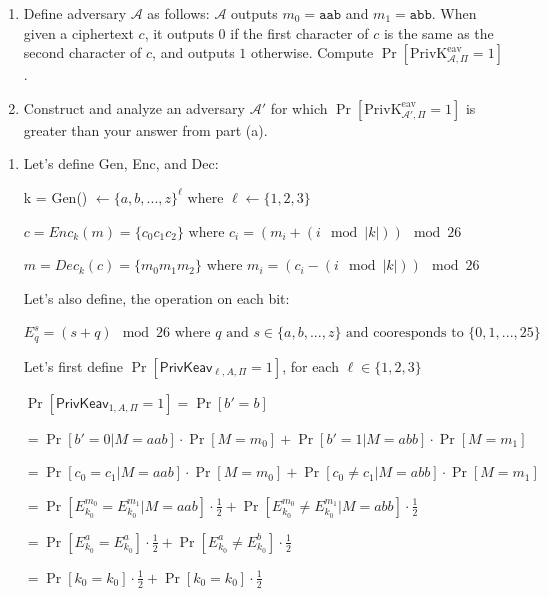 \begin{enumerate}
	\item[(a)] Define adversary $\mathcal{A}$ as follows:  
	$\mathcal{A}$ outputs $m_0=\texttt{aab}$ and $m_1=\texttt{abb}$.  
	When given a ciphertext $c$, it outputs $0$ if the first character of $c$
	is the same as the second character of $c$, and outputs $1$ otherwise.  
	Compute $\Pr[\mathrm{PrivK}^{\mathrm{eav}}_{\mathcal{A},\Pi}=1]$.
	
	\item[(b)] Construct and analyze an adversary $\mathcal{A}'$ for which
	$\Pr[\mathrm{PrivK}^{\mathrm{eav}}_{\mathcal{A}',\Pi}=1]$ is greater than
	your answer from part (a).
\end{enumerate}


\begin{enumerate}
	\item[(a)] Let's define Gen, Enc, and Dec:
	
	k = Gen() $\leftarrow \{a, b, ... , z\}^\ell \text{ where } \ell \leftarrow \{1, 2, 3\}$
	
	$c = Enc_k(m) = \{c_0c_1c_2\} \text{ where } c_i = (m_i + (i \mod |k|))\mod 26$

    $m = Dec_k(c) = \{m_0m_1m_2\} \text{ where } m_i = (c_i - (i \mod |k|))\mod 26$
    
    Let's also define, the operation on each bit:
    
    $E_{q}^{s}  = (s + q) \mod{26} \text{ where } q \text{ and } s \in \{a, b, ..., z\} \text{ and cooresponds to } \{0, 1, ..., 25\}$
    
    Let's first define $\Pr[\mathsf{PrivKeav}_{\ell,A,\Pi}=1]$, for each $\ell \in  \{1, 2, 3\}$
    
    $\Pr[\mathsf{PrivKeav}_{1,A,\Pi}=1] = \Pr[b' = b]$
    
    $= \Pr[b' = 0 | M = aab] \cdot \Pr[M = m_0] + \Pr[b' = 1 | M = abb] \cdot \Pr[M = m_1]$
    
    $= \Pr[c_0 = c_1 | M = aab] \cdot \Pr[M = m_0] + \Pr[c_0 \ne c_1 | M = abb] \cdot \Pr[M = m_1]$
    
    $= \Pr[E_{k_0}^{m_0}  = E_{k_0}^{m_1} | M = aab] \cdot \frac{1}{2} + \Pr[E_{k_0}^{m_0} \ne E_{k_0}^{m_1} | M = abb] \cdot \frac{1}{2}$
    
    $= \Pr[E_{k_0}^{a}  = E_{k_0}^{a}] \cdot \frac{1}{2} + \Pr[E_{k_0}^{a} \ne E_{k_0}^{b}] \cdot \frac{1}{2}$

    $= \Pr[k_0  = k_0] \cdot \frac{1}{2} + \Pr[k_0 = k_0] \cdot \frac{1}{2}$
    

\end{enumerate}
